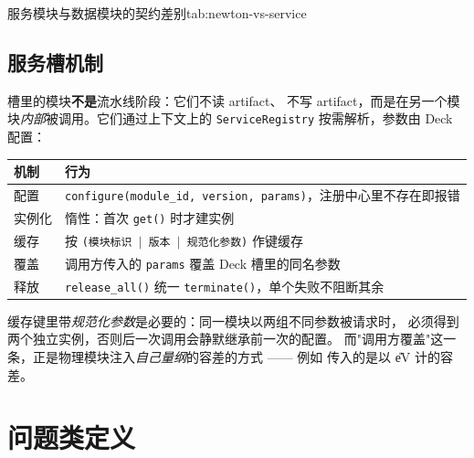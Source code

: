 \begin{veriftable}{服务模块与数据模块的契约差别}{tab:newton-vs-service}
\end{veriftable}

\subsection{服务槽机制}

 槽里的模块\textbf{不是}流水线阶段：它们不读 artifact、
不写 artifact，而是在另一个模块\emph{内部}被调用。它们通过上下文上的
\texttt{ServiceRegistry} 按需解析，参数由 Deck 配置：

\begin{center}
\small
\begin{tabular}{@{}p{} p{}@{}}
\toprule
\textbf{机制} & \textbf{行为}\\
\midrule
配置 & \texttt{configure(module\_id, version, params)}，注册中心里不存在即报错\\
实例化 & 惰性：首次 \texttt{get()} 时才建实例\\
缓存 & 按 \texttt{(模块标识 $|$ 版本 $|$ 规范化参数)} 作键缓存\\
覆盖 & 调用方传入的 \texttt{params} 覆盖 Deck 槽里的同名参数\\
释放 & \texttt{release\_all()} 统一 \texttt{terminate()}，单个失败不阻断其余\\
\bottomrule
\end{tabular}
\end{center}

缓存键里带\emph{规范化参数}是必要的：同一模块以两组不同参数被请求时，
必须得到两个独立实例，否则后一次调用会静默继承前一次的配置。
而"调用方覆盖"这一条，正是物理模块注入\emph{自己量纲}的容差的方式 ——
例如  传入的是以 \U{eV} 计的容差。

\section{问题类定义}
\label{sec:newton-problem}

